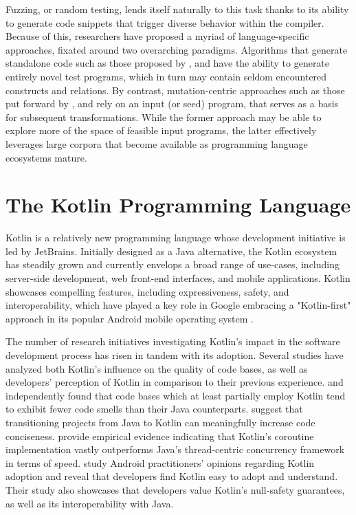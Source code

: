 Fuzzing, or random testing, lends itself naturally to this task thanks to its
ability to generate code snippets that trigger diverse behavior within the compiler.
Because of this, researchers have proposed a myriad of language-specific approaches, 
fixated around two overarching paradigms.
Algorithms that generate standalone code such as those proposed by  
\citet{yang2011finding, holler2012fuzzing, veggalam2016ifuzzer}, and \citet{havrikov2019systematically}
have the ability to generate entirely novel test programs, which in turn may contain
seldom encountered constructs and relations.
By contrast, mutation-centric approaches such as those put forward by 
\citet{le2014compiler, le2015finding, sun2016finding}, and \citet{stepanov2021type}
rely on an input (or seed) program, that serves as a basis for subsequent transformations.
While the former approach may be able to explore more of the
space of feasible input programs, the latter effectively leverages
large corpora that become available as programming language
ecosystems mature.

\section{The Kotlin Programming Language}

Kotlin \cite{kotlinlang} is a relatively new programming language whose development
initiative is led by JetBrains.
Initially designed as a Java alternative, the Kotlin
ecosystem has steadily grown and currently envelops
a broad range of use-cases, including server-side development,
web front-end interfaces, and mobile applications. 
Kotlin showcases compelling features, including expressiveness,
safety, and interoperability, which have played a key role in Google embracing
a "Kotlin-first" approach in its popular Android mobile operating system \cite{kotlinfirst}.

The number of research initiatives investigating Kotlin's impact 
in the software development process has risen in tandem with its adoption.
Several studies have analyzed both Kotlin's influence
on the quality of code bases, as well as developers' perception
of Kotlin in comparison to their previous experience.
\citet{flauzino2018you}  and \citet{gois2019empirical} independently
found that code bases which at least partially employ Kotlin tend to
exhibit fewer code smells than their Java counterparts. 
\citet{ardito2020effectiveness} suggest that transitioning projects
from Java to Kotlin can meaningfully increase code conciseness.
\citet{chauhan2021performance} provide empirical evidence indicating
that Kotlin's coroutine implementation vastly outperforms
Java's thread-centric concurrency framework in terms of speed.
\citet{oliveira2020adoption} study Android practitioners' opinions regarding
Kotlin adoption and reveal that developers find Kotlin easy
to adopt and understand. 
Their study also showcases that developers value Kotlin's
null-safety guarantees, as well as its interoperability with Java.

